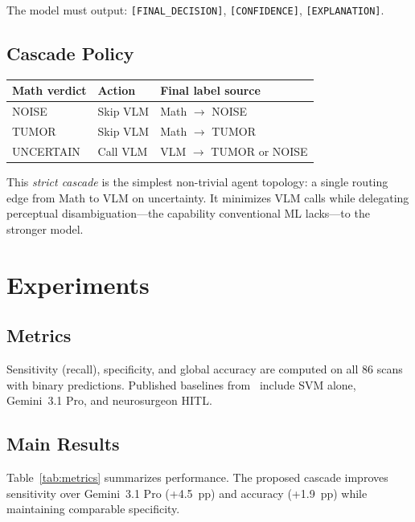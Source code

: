 \documentclass[11pt]{article}
\begin{document}
The model must output:
\texttt{[FINAL\_DECISION]}, \texttt{[CONFIDENCE]}, \texttt{[EXPLANATION]}.

\subsection{Cascade Policy}

\begin{center}
\begin{tabular}{lll}
\toprule
Math verdict & Action & Final label source \\
\midrule
NOISE  & Skip VLM & Math $\rightarrow$ NOISE \\
TUMOR  & Skip VLM & Math $\rightarrow$ TUMOR \\
UNCERTAIN & Call VLM & VLM $\rightarrow$ TUMOR or NOISE \\
\bottomrule
\end{tabular}
\end{center}

This \emph{strict cascade} is the simplest non-trivial agent topology: a single routing edge from Math to VLM on uncertainty.
It minimizes VLM calls while delegating perceptual disambiguation---the capability conventional ML lacks---to the stronger model.

\section{Experiments}

\subsection{Metrics}

Sensitivity (recall), specificity, and global accuracy are computed on all 86 scans with binary predictions.
Published baselines from~\cite{mdpi2024} include SVM alone, Gemini~3.1 Pro, and neurosurgeon HITL.

\subsection{Main Results}

Table~\ref{tab:metrics} summarizes performance.
The proposed cascade improves sensitivity over Gemini~3.1 Pro (+4.5~pp) and accuracy (+1.9~pp) while maintaining comparable specificity.
\end{document}
